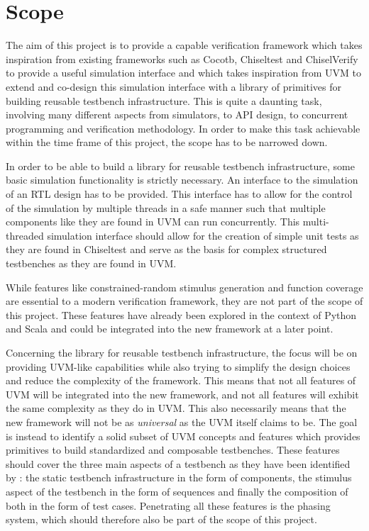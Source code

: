 \section{Scope} %

The aim of this project is to provide a capable verification framework which takes inspiration from existing frameworks such as Cocotb, Chiseltest and ChiselVerify to provide a useful simulation interface and which takes inspiration from UVM to extend and co-design this simulation interface with a library of primitives for building reusable testbench infrastructure. This is quite a daunting task, involving many different aspects from simulators, to API design, to concurrent programming and verification methodology. In order to make this task achievable within the time frame of this project, the scope has to be narrowed down.

In order to be able to build a library for reusable testbench infrastructure, some basic simulation functionality is strictly necessary. An interface to the simulation of an RTL design has to be provided. This interface has to allow for the control of the simulation by multiple threads in a safe manner such that multiple components like they are found in UVM can run concurrently. This multi-threaded simulation interface should allow for the creation of simple unit tests as they are found in Chiseltest and serve as the basis for complex structured testbenches as they are found in UVM.

While features like constrained-random stimulus generation and function coverage are essential to a modern verification framework, they are not part of the scope of this project. These features have already been explored in the context of Python and Scala and could be integrated into the new framework at a later point. 

Concerning the library for reusable testbench infrastructure, the focus will be on providing UVM-like capabilities while also trying to simplify the design choices and reduce the complexity of the framework. This means that not all features of UVM will be integrated into the new framework, and not all features will exhibit the same complexity as they do in UVM. This also necessarily means that the new framework will not be as \textit{universal} as the UVM itself claims to be. The goal is instead to identify a solid subset of UVM concepts and features which provides primitives to build standardized and composable testbenches. These features should cover the three main aspects of a testbench as they have been identified by \citeauthor{sutherland2015uvm} \cite{sutherland2015uvm}: the static testbench infrastructure in the form of components, the stimulus aspect of the testbench in the form of sequences and finally the composition of both in the form of test cases. Penetrating all these features is the phasing system, which should therefore also be part of the scope of this project.

